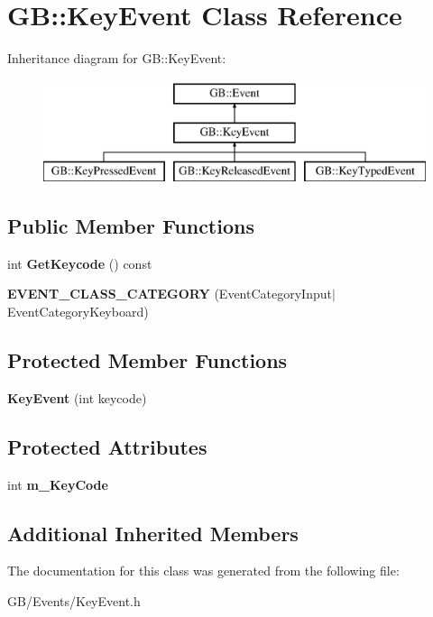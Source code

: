 \hypertarget{class_g_b_1_1_key_event}{}\section{GB\+::Key\+Event Class Reference}
\label{class_g_b_1_1_key_event}
Inheritance diagram for GB\+::Key\+Event\+:\begin{figure}[H]
\begin{center}
\leavevmode
\includegraphics[height=3.000000cm]{class_g_b_1_1_key_event}
\end{center}
\end{figure}
\subsection*{Public Member Functions}
\begin{DoxyCompactItemize}
\item 
\mbox{\label{class_g_b_1_1_key_event_af526c3de3b07dd162110eedbefcbae84}} 
int {\bfseries Get\+Keycode} () const
\item 
\mbox{\label{class_g_b_1_1_key_event_ac9f202ee0c6524194cfc8c28406dbee5}} 
{\bfseries E\+V\+E\+N\+T\+\_\+\+C\+L\+A\+S\+S\+\_\+\+C\+A\+T\+E\+G\+O\+RY} (Event\+Category\+Input$\vert$Event\+Category\+Keyboard)
\end{DoxyCompactItemize}
\subsection*{Protected Member Functions}
\begin{DoxyCompactItemize}
\item 
\mbox{\label{class_g_b_1_1_key_event_af53a5c685b011e4628e84ef92b89de7a}} 
{\bfseries Key\+Event} (int keycode)
\end{DoxyCompactItemize}
\subsection*{Protected Attributes}
\begin{DoxyCompactItemize}
\item 
\mbox{\label{class_g_b_1_1_key_event_ae5fc49b8fe63da4b7f560efb141a9551}} 
int {\bfseries m\+\_\+\+Key\+Code}
\end{DoxyCompactItemize}
\subsection*{Additional Inherited Members}


The documentation for this class was generated from the following file\+:\begin{DoxyCompactItemize}
\item 
G\+B/\+Events/Key\+Event.\+h\end{DoxyCompactItemize}
